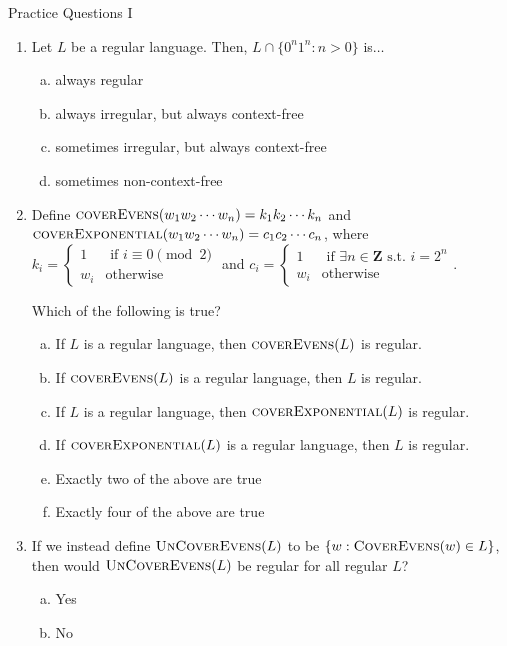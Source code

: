 \documentclass{beamer}
\begin{document}
\begin{frame}[t]{Practice Questions I}
\begin{enumerate}
    \item Let $L$ be a regular language. Then, $L \cap \{0^n1^n: n > 0\}$ is$\dotsc$

    \begin{enumerate}[(a)]
        \item always regular
        \item always irregular, but always context-free
        \item sometimes irregular, but always context-free %
        \item sometimes non-context-free
    \end{enumerate}
    
    \pause\item Define $\textsc{coverEvens}(w_1 w_2 \dotsb w_n) =  k_1 k_2 \dotsb k_n$ and $\textsc{coverExponential}(w_1 w_2 \dotsb w_n) =  c_1 c_2 \dotsb c_n$, where $k_i = \begin{cases}
        1 &\text{ if } i \equiv 0 \pmod{2}\\
        w_i &\text{otherwise}
    \end{cases}$ and $c_i = \begin{cases}
        1 &\text{ if } \exists n \in \mathbf{Z} \text{ s.t. } i = 2^n\\
        w_i &\text{otherwise}
    \end{cases}$. 
    
    Which of the following is true?
    \begin{enumerate}[(a)]
        \item If $L$ is a regular language, then $\textsc{coverEvens}(L)$ is regular. %
        \item If $\textsc{coverEvens}(L)$ is a regular language, then $L$ is regular. %
        \item If $L$ is a regular language, then $\textsc{coverExponential}(L)$ is regular.
        \item If $\textsc{coverExponential}(L)$ is a regular language, then  $L$ is regular.
        \item Exactly two of the above are true
        \item Exactly four of the above are true
    \end{enumerate}
    \pause\item If we instead define $\textsc{UnCoverEvens}(L)$ to be $\{w: \textsc{CoverEvens}(w) \in L\}$, then would $\textsc{UnCoverEvens}(L)$ be regular for all regular $L$?
    \begin{enumerate}[(a)]
        \item Yes %
        \item No
    \end{enumerate}
\end{enumerate}
\end{frame}
\end{document}
